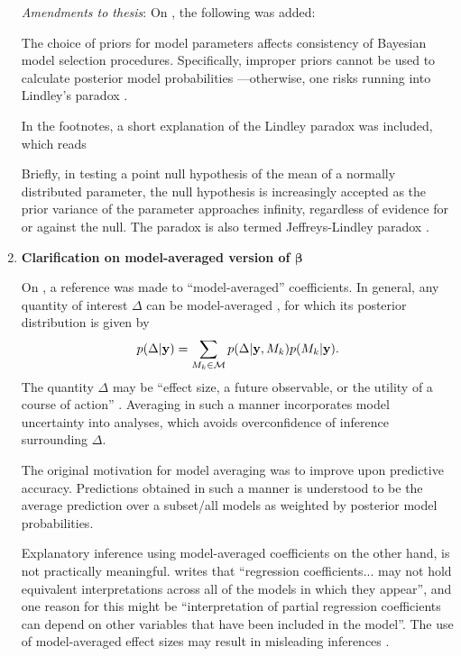\documentclass[11pt,showframe,twoside,openright]{report}
\begin{document}
\begin{enumerate}
  \textit{Amendments to thesis}: On , the following was added:
  
\begin{displayquote}
The choice of priors for model parameters affects consistency of Bayesian model selection procedures. 
Specifically, improper priors cannot be used to calculate posterior model probabilities \citep{casella2009consistency} ---otherwise, one risks running into Lindley's paradox \citep{lindley1957statistical}.
\end{displayquote} 

  In the footnotes, a short explanation of the Lindley paradox was included, which reads

\begin{displayquote}
Briefly, in testing a point null hypothesis of the mean of a normally distributed parameter, the null hypothesis is increasingly accepted as the prior variance of the parameter approaches infinity, regardless of evidence for or against the null.
The paradox is also termed Jeffreys-Lindley paradox \citep{robert2014jeffreys}.
\end{displayquote} 
  
    
  \item \textbf{Clarification on model-averaged version of $\boldsymbol\beta$}

  On , a reference was made to ``model-averaged'' coefficients.
  In general, any quantity of interest $\Delta$ can be model-averaged \citep{madigan1994model}, for which its posterior distribution is given by
  \begin{equation}
    p(\Delta|{\mathbf y}) = \sum_{M_k \in {\mathcal M}} p(\Delta|{\mathbf y},M_k) p(M_k|{\mathbf y}).
  \end{equation}
  The quantity $\Delta$ may be ``effect size, a future observable, or the utility of a course of action'' \citep{madigan1994model, hoeting1999bayesian}.
  Averaging in such a manner incorporates model uncertainty into analyses, which avoids overconfidence of inference surrounding $\Delta$.

  The original motivation for model averaging was to improve upon predictive accuracy.
  Predictions obtained in such a manner is understood to be the average prediction over a subset/all models as weighted by posterior model probabilities.
  
  Explanatory inference using model-averaged coefficients on the other hand, is not practically meaningful.
  \citet{banner2017considerations} writes that ``regression coefficients... may not hold equivalent interpretations across all of the models in which they appear'', and one reason for this might be ``interpretation of partial regression coefficients can depend on other variables that have been included in the model''.
  The use of model-averaged effect sizes may result in misleading inferences \citep{cade2015model}.
  

\end{enumerate}
\end{document}
